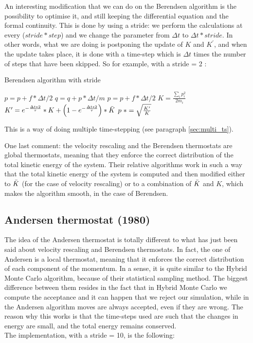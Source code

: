 An interesting modification that we can do on the Berendsen algorithm is the possibility to optimise it, and still keeping the differential equation and the formal continuity. This is done by using a stride: we perform the calculations at every ($stride*step$) and we change the parameter from $\Delta t $ to $\Delta t * stride$. In other words, what we are doing is postponing the update of $K$ and $K^\prime$, and when the update takes place, it is done with a time-step which is $\Delta t$ times the number of steps that have been skipped. 
So for example, with a stride = 2 :
 \begin{algorithm}[H]\label{berendsen_stride}
			\caption{Berendsen algorithm with stride}
			\begin{algorithmic}[1]
				\State $p=p+f*\Delta t/2$
				\State $q=q+p*\Delta t/m$
				\State $p=p+f*\Delta t/2$
				\State $K= \frac{\sum_{i}{p_i^2}}{{2m_i}}$
				\State $K'= e^{-\frac{\Delta t*2}{\tau}}*K + \left(1-e^{-\frac{\Delta t*2}{\tau}}\right)*\Bar{K}$
				\State $p \hspace{0.1cm}*= \sqrt{\frac{K'}{K}}$
				\EndIf
				\EndFor
			\end{algorithmic}
		\end{algorithm}

This is a way of doing multiple time-stepping (see paragraph \ref{sec:multi_ts}).

One last comment: the velocity rescaling and the Berendsen thermostats are global thermostats, meaning that they enforce the correct distribution of the total kinetic energy of the system. Their relative algorithms work in such a way that the total kinetic energy of the system is computed and then modified either to $\Bar{K}$ (for the case of velocity rescaling) or to a combination of $\Bar{K}$ and $K$, which makes the algorithm smooth, in the case of Berendsen.

\subsection{Andersen thermostat (1980)}

The idea of the Andersen thermostat is totally different to what has just been said about velocity rescaling and Berendsen thermostats. In fact, the one of Andersen is a local thermostat, meaning that it enforces the correct distribution of each component of the momentum.  In a sense, it is quite similar to the Hybrid Monte Carlo algorithm, because of their statistical sampling method. The biggest difference between them resides in the fact that in Hybrid Monte Carlo we compute the acceptance and it can happen that we reject our simulation, while in the Andersen algorithm moves are always accepted, even if they are wrong. The reason why this works is that the time-steps used are such that the changes in energy are small, and the total energy remains conserved.\\
The implementation, with a stride = 10, is the following:

